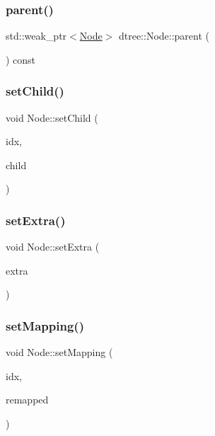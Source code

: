 \subsubsection{\texorpdfstring{parent()}{parent()}}
{\footnotesize\ttfamily std\+::weak\+\_\+ptr$<$\mbox{\hyperlink{classdtree_1_1_node}{Node}}$>$ dtree\+::\+Node\+::parent (\begin{DoxyParamCaption}{ }\end{DoxyParamCaption}) const\hspace{0.3cm}{\ttfamily [inline]}}

\mbox{\label{classdtree_1_1_node_ab7c733478351a59ef46aad36b34bef41}} 
\subsubsection{\texorpdfstring{setChild()}{setChild()}}
{\footnotesize\ttfamily void Node\+::set\+Child (\begin{DoxyParamCaption}\item[{int}]{idx,  }\item[{std\+::shared\+\_\+ptr$<$ \mbox{\hyperlink{classdtree_1_1_node}{Node}} $>$}]{child }\end{DoxyParamCaption})}

\mbox{\label{classdtree_1_1_node_a0c3f57b73bd7252f8723b4dc31185da2}} 
\subsubsection{\texorpdfstring{setExtra()}{setExtra()}}
{\footnotesize\ttfamily void Node\+::set\+Extra (\begin{DoxyParamCaption}\item[{std\+::shared\+\_\+ptr$<$ \mbox{\hyperlink{classdtree_1_1_node_extra}{Node\+Extra}} $>$}]{extra }\end{DoxyParamCaption})}

\mbox{\label{classdtree_1_1_node_a8dd25ca52f48a197d24662b366166fc6}} 
\subsubsection{\texorpdfstring{setMapping()}{setMapping()}}
{\footnotesize\ttfamily void Node\+::set\+Mapping (\begin{DoxyParamCaption}\item[{int}]{idx,  }\item[{int}]{remapped }\end{DoxyParamCaption})}

